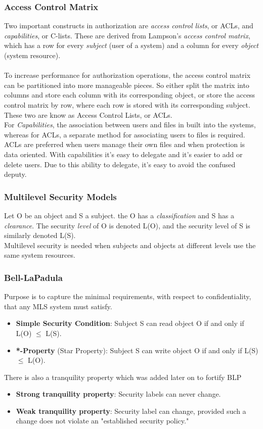 \documentclass{article}
\begin{document}
\subsubsection{Access Control Matrix}
Two important constructs in authorization are \textit{access control lists}, or ACLs, and \textit{capabilities}, or C-lists. These are derived from Lampson's \textit{access control matrix}, which has a row for every \textit{subject} (user of a system) and a column for every \textit{object} (system resource).\\\\
To increase performance for authorization operations, the access control matrix can be partitioned into more manageable pieces. So either split the matrix into columns and store each column with its corresponding object, or store the access control matrix by row, where each row is stored with its corresponding subject.
These two are know as Access Control Lists, or ACLs.\\
For \textit{Capabilities}, the association between users and files in built into the systems, whereas for ACLs, a separate method for associating users to files is required.\\
ACLs are preferred when users manage their own files and when protection is data oriented. With capabilities it's easy to delegate and it's easier to add or delete users. Due to this ability to delegate, it's easy to avoid the confused deputy.

\subsubsection{Multilevel Security Models}
Let O be an object and S a subject. the O has a \textit{classification} and S has a \textit{clearance}. The security \textit{level} of O is denoted L(O), and the security level of S is similarly denoted L(S).\\
Multilevel security is needed when subjects and objects at different levels use the same system resources.

\subsubsection{Bell-LaPadula}
Purpose is to capture the minimal requirements, with respect to confidentiality, that any MLS system must satisfy.
\begin{itemize}
    \item \textbf{Simple Security Condition}: Subject S can read object O if and only if L(O) $\leq$ L(S).
    \item \textbf{*-Property} (Star Property): Subject S can write object O if and only if L(S) $\leq$ L(O).
\end{itemize}
There is also a tranquility property which was added later on to fortify BLP
\begin{itemize}
    \item\textbf{Strong tranquility property}: Security labels can never change.
    \item \textbf{Weak tranquility property}: Security label can change, provided such a change does not violate an "established security policy."
\end{itemize}
\end{document}
